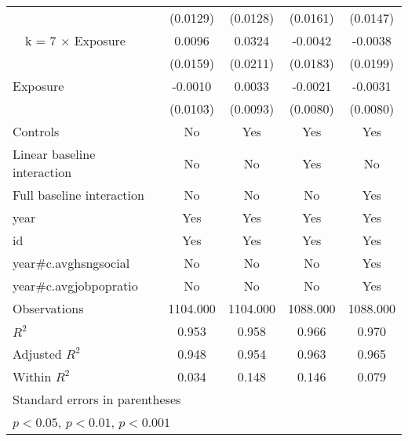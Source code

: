 {\begin{tabular}{l*{4}{c}}
                & (0.0129)         & (0.0128)         & (0.0161)         & (0.0147)         \\
\addlinespace
~~k = 7 $\times$ Exposure&   0.0096         &   0.0324         &  -0.0042         &  -0.0038         \\
                & (0.0159)         & (0.0211)         & (0.0183)         & (0.0199)         \\
\addlinespace
Exposure        &  -0.0010         &   0.0033         &  -0.0021         &  -0.0031         \\
                & (0.0103)         & (0.0093)         & (0.0080)         & (0.0080)         \\
\addlinespace
Controls        &     {No}         &    {Yes}         &    {Yes}         &    {Yes}         \\
\addlinespace
Linear baseline interaction &     {No}         &     {No}         &    {Yes}         &     {No}         \\
\addlinespace
Full baseline interaction&     {No}         &     {No}         &     {No}         &    {Yes}         \\
\addlinespace
year            &    {Yes}         &    {Yes}         &    {Yes}         &    {Yes}         \\
\addlinespace
id              &    {Yes}         &    {Yes}         &    {Yes}         &    {Yes}         \\
\addlinespace
year#c.avghsngsocial&     {No}         &     {No}         &     {No}         &    {Yes}         \\
\addlinespace
year#c.avgjobpopratio&     {No}         &     {No}         &     {No}         &    {Yes}         \\
\midrule
Observations    & 1104.000         & 1104.000         & 1088.000         & 1088.000         \\
\(R^{2}\)       &    0.953         &    0.958         &    0.966         &    0.970         \\
Adjusted \(R^{2}\)&    0.948         &    0.954         &    0.963         &    0.965         \\
Within \(R^{2}\)&    0.034         &    0.148         &    0.146         &    0.079         \\
\bottomrule
\multicolumn{5}{l}{\footnotesize Standard errors in parentheses}\\
\multicolumn{5}{l}{\footnotesize \sym{*} \(p<0.05\), \sym{**} \(p<0.01\), \sym{***} \(p<0.001\)}\\
\end{tabular}
}
